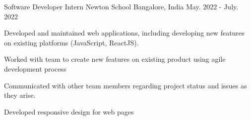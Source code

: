 

\begin{cventries}

  \cventry
    {Software Developer Intern} %
    {Newton School} %
    {Bangalore, India} %
    {May. 2022 - July. 2022} %
    {
      \begin{cvitems} %
      \item{Developed and maintained web applications, including developing new features on existing platforms (JavaScript, ReactJS).}
      \item{Worked with team to create new features on existing product using agile development process}
      \item {Communicated with other team members regarding project status and issues as they arise.}
      \item{Developed responsive design for web pages}
      \end{cvitems}
    }


\end{cventries}
